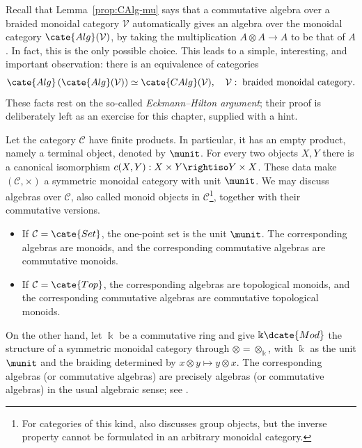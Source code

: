 Recall that Lemma~\ref{prop:CAlg-mu} says that a commutative algebra over a
braided monoidal category $\mathcal{V}$ automatically gives an algebra over
the monoidal category $\cate{Alg}(\mathcal{V})$, by taking the multiplication
$A\otimes A\to A$ to be that of $A$. In fact, this is the only possible
choice. This leads to a simple, interesting, and important observation: there
is an equivalence of categories
\begin{equation}\label{eqn:AlgAlg-CAlg}
	\cate{Alg}\left(\cate{Alg}(\mathcal{V}) \right) \simeq \cate{CAlg}(\mathcal{V}), \quad \mathcal{V}:\;\text{braided monoidal category}.
\end{equation}
These facts rest on the so-called \emph{Eckmann--Hilton argument}; their proof
is deliberately left as an exercise for this chapter, supplied with a hint.

\begin{example}\label{eg:Cartesius-monoidal}
	Let the category $\mathcal{C}$ have finite products. In particular, it
	has an empty product, namely a terminal object, denoted by $\munit$. For
	every two objects $X,Y$ there is a canonical isomorphism
	$c(X,Y):X\times Y\rightiso Y\times X$. These data make
	$(\mathcal{C},\times)$ a symmetric monoidal category with unit $\munit$.
	We may discuss algebras over $\mathcal{C}$, also called monoid objects in
	$\mathcal{C}$\footnote{For categories of this kind,
	\cite[\S 4.11]{Li1} also discusses group objects, but the inverse property
	cannot be formulated in an arbitrary monoidal category.}, together with
	their commutative versions.
	\begin{itemize}
		\item If $\mathcal{C}=\cate{Set}$, the one-point set is the unit
		$\munit$. The corresponding algebras are monoids, and the
		corresponding commutative algebras are commutative monoids.
		\item If $\mathcal{C}=\cate{Top}$, the corresponding algebras are
		topological monoids, and the corresponding commutative algebras are
		commutative topological monoids.
	\end{itemize}
	
	On the other hand, let $\Bbbk$ be a commutative ring and give
	$\Bbbk\dcate{Mod}$ the structure of a symmetric monoidal category through
	$\otimes=\otimes_{\Bbbk}$, with $\Bbbk$ as the unit $\munit$ and the
	braiding determined by $x\otimes y\mapsto y\otimes x$. The corresponding
	algebras (or commutative algebras) are precisely algebras (or commutative
	algebras) in the usual algebraic sense; see
	\cite[Definition 7.1.1]{Li1}.
\end{example}

